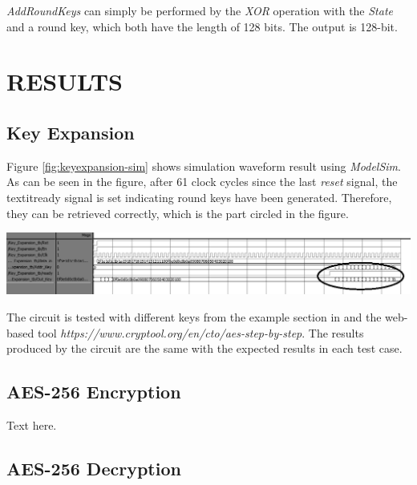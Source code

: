 \documentclass[a4paper, 10pt]{article}
\newenvironment{Figure}
    {\par\medskip\noindent\minipage{\linewidth}}
    {\endminipage\par\medskip}
\begin{document}
\begin{multicols}{2}
            \textit{AddRoundKeys} can simply be performed by the \textit{XOR} operation with the \textit{State} and a round key, which both have the length of 128 bits. The output is 128-bit.

        \section{RESULTS}

        \subsection{Key Expansion}

        Figure \ref{fig:keyexpansion-sim} shows simulation waveform result using \textit{ModelSim}. As can be seen in the figure, after 61 clock cycles since the last \textit{reset} signal, the textit{ready} signal is set indicating round keys have been generated. Therefore, they can be retrieved correctly, which is the part circled in the figure.

            \begin{Figure}
                \centering
                \includegraphics[width=\linewidth]{KeyExpansion-GetRoundKeysStage-edited.png}
                \label{fig:keyexpansion-sim}
            \end{Figure}

        The circuit is tested with different keys from the example section in \cite{AES} and the web-based tool \textit{https://www.cryptool.org/en/cto/aes-step-by-step}. The results produced by the circuit are the same with the expected results in each test case.

        \subsection{AES-256 Encryption}

        Text here.

        \subsection{AES-256 Decryption}


\end{multicols}
\end{document}
